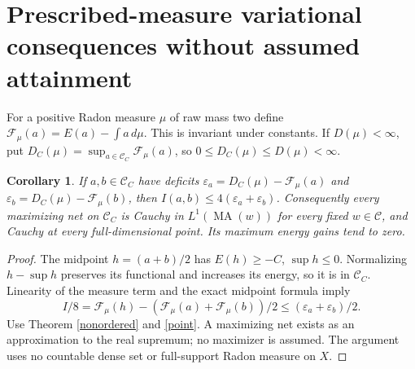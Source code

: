 \documentclass[11pt]{article}
\newcommand{\MA}{\operatorname{MA}}
\newcommand{\C}{\mathcal C}
\newtheorem{corollary}[theorem]{Corollary}
\theoremstyle{remark}\newtheorem{remark}[theorem]{Remark}
\begin{document}
\section{Prescribed-measure variational consequences without assumed attainment}
For a positive Radon measure $\mu$ of raw mass two define
$\mathcal F_\mu(a)=E(a)-\int a\,d\mu$. This is invariant under
constants. If $D(\mu)<\infty$, put
$D_C(\mu)=\sup_{a\in\C_C}\mathcal F_\mu(a)$, so
$0\le D_C(\mu)\le D(\mu)<\infty$.

\begin{corollary}\label{maximizing}
If $a,b\in\C_C$ have deficits
$\varepsilon_a=D_C(\mu)-\mathcal F_\mu(a)$ and
$\varepsilon_b=D_C(\mu)-\mathcal F_\mu(b)$, then
$I(a,b)\le4(\varepsilon_a+\varepsilon_b)$.
Consequently every maximizing net on $\C_C$ is Cauchy in
$L^1(\MA(w))$ for every fixed $w\in\C$, and Cauchy at every
full-dimensional point. Its maximum energy gains tend to zero.
\end{corollary}
\begin{proof}
The midpoint $h=(a+b)/2$ has $E(h)\ge-C$, $\sup h\le0$.
Normalizing $h-\sup h$ preserves its functional and increases its
energy, so it is in $\C_C$. Linearity of the measure term and the
exact midpoint formula imply
\[
 I/8=\mathcal F_\mu(h)-
       (\mathcal F_\mu(a)+\mathcal F_\mu(b))/2
 \le(\varepsilon_a+\varepsilon_b)/2.
\]
Use Theorem \ref{nonordered} and \eqref{point}. A maximizing net
exists as an approximation to the real supremum; no maximizer is
assumed. The argument uses no countable dense set or full-support
Radon measure on $X$.
\end{proof}
\end{document}
